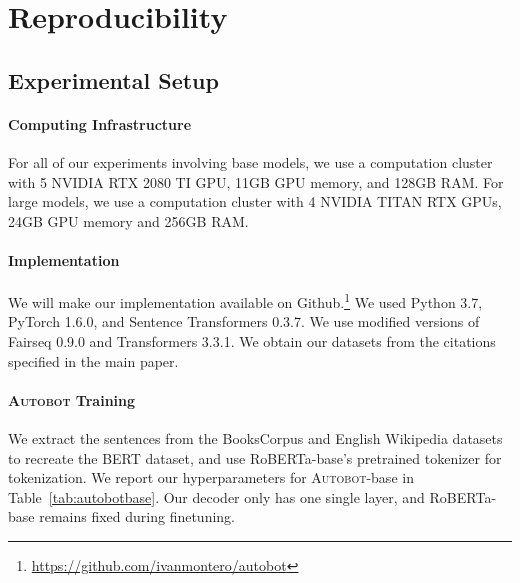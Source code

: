 \label{sec:appendix}

\section{Reproducibility}

\subsection{Experimental Setup}

\paragraph{Computing Infrastructure}
For all of our experiments involving base models, we use a computation cluster with 5 NVIDIA RTX 2080 TI GPU, 11GB GPU memory, and 128GB RAM. For large models, we use a computation cluster with 4 NVIDIA TITAN RTX GPUs, 24GB GPU memory and 256GB RAM.

\paragraph{Implementation}
We will make our implementation available on Github.\footnote{\url{https://github.com/ivanmontero/autobot}} We used Python 3.7, PyTorch  1.6.0, and Sentence Transformers 0.3.7. We use modified versions of Fairseq 0.9.0 and Transformers 3.3.1. We obtain our datasets from the citations specified in the main paper.


\paragraph{\textsc{Autobot} Training}\label{adx:autobottraining}
We extract the sentences from the BooksCorpus and English Wikipedia datasets to recreate the BERT dataset, and use RoBERTa-base's pretrained tokenizer for tokenization. We report our hyperparameters for \textsc{Autobot}-base in Table~\ref{tab:autobotbase}. Our decoder only has one single layer, and RoBERTa-base remains fixed during finetuning.


